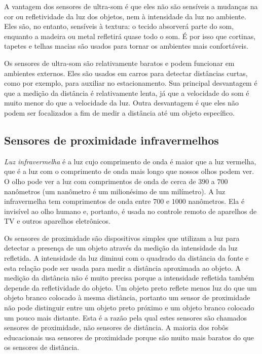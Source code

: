 A vantagem dos sensores de ultra-som é que eles não são sensíveis a mudanças na cor ou refletividade da luz dos objetos, nem à intensidade da luz no ambiente. Eles são, no entanto, sensíveis à textura: o tecido absorverá parte do som, enquanto a madeira ou metal refletirá quase todo o som. É por isso que cortinas, tapetes e telhas macias são usados para tornar os ambientes mais confortáveis.

Os sensores de ultra-som são relativamente baratos e podem funcionar em ambientes externos. Eles são usados em carros para detectar distâncias curtas, como por exemplo, para auxiliar no estacionamento. Sua principal desvantagem é que a medição da distância é relativamente lenta, já que a velocidade do som é muito menor do que a velocidade da luz. Outra desvantagem é que eles não podem ser focalizados a fim de medir a distância até um objeto específico.

\subsection{Sensores de proximidade infravermelhos}

\emph{Luz infravermelha} é a luz cujo comprimento de onda é maior que a luz vermelha, que é a luz com o comprimento de onda mais longo que nossos olhos podem ver. O olho pode ver a luz com comprimentos de onda de cerca de $390$ a $700$ nanômetros (um nanômetro é um milionésimo de um milímetro). A luz infravermelha tem comprimentos de onda entre $700$ e $1000$ nanômetros. Ela é invisível ao olho humano e, portanto, é usada no controle remoto de aparelhos de TV e outros aparelhos eletrônicos.

Os sensores de proximidade são dispositivos simples que utilizam a luz para detectar a presença de um objeto através da medição da intensidade da luz refletida. A intensidade da luz diminui com o quadrado da distância da fonte e esta relação pode ser usada para medir a distância aproximada ao objeto. A medição da distância não é muito precisa porque a intensidade refletida também depende da refletividade do objeto. Um objeto preto reflete menos luz do que um objeto branco colocado à mesma distância, portanto um sensor de proximidade não pode distinguir entre um objeto preto próximo e um objeto branco colocado um pouco mais distante. Esta é a razão pela qual estes sensores são chamados sensores de proximidade, não sensores de distância. A maioria dos robôs educacionais usa sensores de proximidade porque são muito mais baratos do que os sensores de distância.

